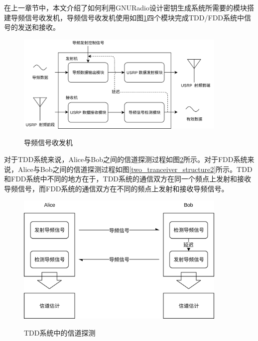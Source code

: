 \documentclass[master]{seuthesis} %
\begin{document}
\begin{Main}
在上一章节中，本文介绍了如何利用GNURadio设计密钥生成系统所需要的模块搭建导频信号收发机，导频信号收发机使用如图\ref{tranceiver_structure}四个模块完成TDD/FDD系统中信号的发送和接收。

\begin{figure}
    \centering
    \includegraphics[width=0.9\textwidth]{images/tranceiver_structure}
    \caption{导频信号收发机}{} 
    \label{tranceiver_structure}
\end{figure}

对于TDD系统来说，Alice与Bob之间的信道探测过程如图\ref{two_tranceiver_structure}所示。对于FDD系统来说，Alice与Bob之间的信道探测过程如图\ref{two_tranceiver_structure2}所示。TDD和FDD系统中不同的地方在于，TDD系统的通信双方在同一个频点上发射和接收导频信号，而FDD系统的通信双方在不同的频点上发射和接收导频信号。


\begin{figure}
    \centering
    \includegraphics[width=0.9\textwidth]{images/two_tranceiver_structure}
    \caption{TDD系统中的信道探测}{} 
    \label{two_tranceiver_structure}
\end{figure}


\end{Main}
\end{document}
